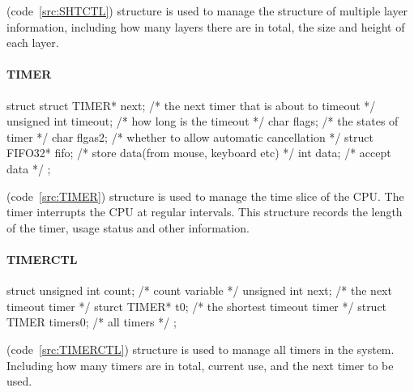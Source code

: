 \documentclass{swfcthesis}
\begin{document}
(code~\ref{src:SHTCTL}) structure is used to manage the structure of multiple layer information,
including how many layers there are in total, the size and height of each layer.



\paragraph{TIMER}

\begin{listing}[H]
  \begin{codeblock}
\begin{ccode}
struct 
{ 
  struct TIMER* next;   /* the next timer that is about to timeout */
  unsigned int timeout; /* how long is the timeout */
  char flags;           /* the states of timer */
  char flgas2;          /* whether to allow automatic cancellation */
  struct FIFO32* fifo;  /* store data(from mouse, keyboard etc) */
  int data;             /* accept data */
};
\end{ccode}
  \end{codeblock}
  \caption{\texttt{struct TIMER}}\label{src:TIMER}
\end{listing}

(code~\ref{src:TIMER}) structure is used to manage the time slice of the CPU. The timer
interrupts the CPU at regular intervals. This structure records the length of the timer,
usage status and other information.



\paragraph{TIMERCTL}

\begin{listing}[H]
  \begin{codeblock}
\begin{ccode}
struct 
{ 
  unsigned int count;   /* count variable */
  unsigned int next;    /* the next timeout timer */
  sturct TIMER* t0;     /* the shortest timeout timer */
  struct TIMER timers0; /* all timers */
};
\end{ccode}
  \end{codeblock}
  \caption{\texttt{struct TIMERCTL}}\label{src:TIMERCTL}
\end{listing}

(code~\ref{src:TIMERCTL}) structure is used to manage all timers in the system. Including
how many timers are in total, current use, and the next timer to be used.
\end{document}
